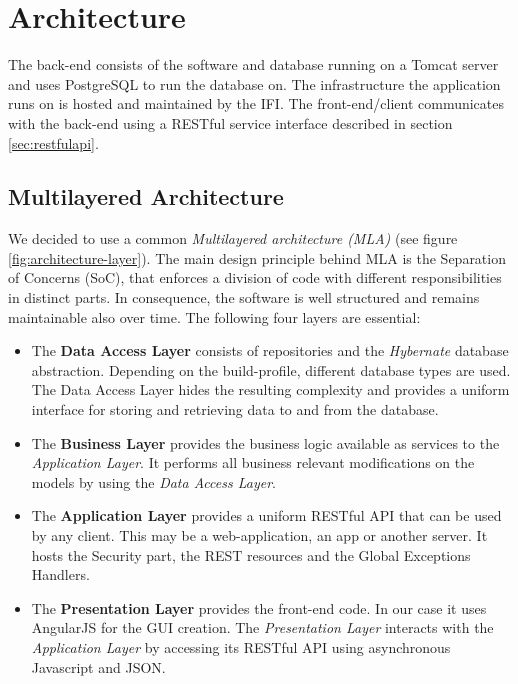 \newpage


\section{Architecture}

The back-end consists of the software and database running on a Tomcat \cite{tomcat} server and uses PostgreSQL \cite{postgresql} to run the database on. The infrastructure the application runs on is hosted and maintained by the IFI. The front-end/client communicates with the back-end using a RESTful service interface described in section \ref{sec:restfulapi}.

\subsection{Multilayered Architecture}
We decided to use a common \textit{Multilayered architecture (MLA)}\cite{mla} (see figure \ref{fig:architecture-layer}). The main design principle behind MLA is the Separation of Concerns (SoC), that enforces a division of code with different responsibilities in distinct parts. In consequence, the software is well structured and remains maintainable also over time. The following four layers are essential:
\begin{itemize}
	\item The \textbf{Data Access Layer} consists of repositories and the \textit{Hybernate} database abstraction. Depending on the build-profile, different database types are used. The Data Access Layer hides the resulting complexity and provides a uniform interface for storing and retrieving data to and from the database.
	\item The \textbf{Business Layer} provides the business logic available as services to the \textit{Application Layer}. It performs all business relevant modifications on the models by using the \textit{Data Access Layer}.	
	\item The \textbf{Application Layer} provides a uniform RESTful API that can be used by any client. This may be a web-application, an app or another server. It hosts the Security part, the REST resources and the Global Exceptions Handlers.
	\item The \textbf{Presentation Layer} provides the front-end code. In our case it uses AngularJS for the GUI creation. The \textit{Presentation Layer} interacts with the \textit{Application Layer} by accessing its RESTful API using asynchronous Javascript and JSON.
\end{itemize}

